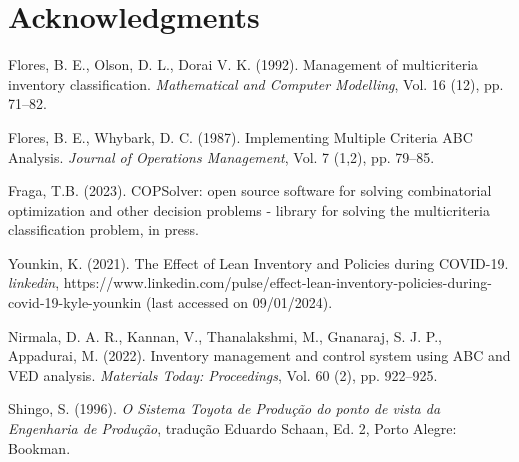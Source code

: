 \documentclass[authoryear,manuscript,12pt]{elsarticle}
\begin{document}
\section{Acknowledgments}
\label{sec:acknowledgments}





\begin{thebibliography}{1}


Flores, B. E., Olson, D. L., Dorai V. K. (1992). Management of multicriteria inventory classification. {\it Mathematical and Computer Modelling}, Vol. 16 (12), pp. 71--82.

Flores, B. E., Whybark, D. C. (1987). Implementing Multiple Criteria ABC Analysis. {\it Journal of Operations Management}, Vol. 7 (1,2), pp. 79--85.

Fraga, T.B. (2023). COPSolver: open source software for solving combinatorial optimization and other decision problems - library for solving the multicriteria classification problem, in press.

Younkin, K. (2021). The Effect of Lean Inventory and Policies during COVID-19. {\it linkedin}, https://www.linkedin.com/pulse/effect-lean-inventory-policies-during-covid-19-kyle-younkin (last accessed on 09/01/2024).

Nirmala, D. A. R., Kannan, V., Thanalakshmi, M., Gnanaraj, S. J. P., Appadurai, M. (2022). Inventory management and control system using ABC and VED analysis. {\it Materials Today: Proceedings}, Vol. 60 (2), pp. 922--925.

Shingo, S. (1996). {\it O Sistema Toyota de Produção do ponto de vista da Engenharia de Produção}, tradução Eduardo Schaan, Ed. 2, Porto Alegre: Bookman.

\end{thebibliography}
\end{document}
